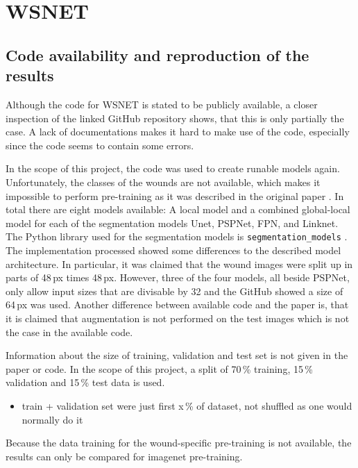 \section{WSNET}

\subsection{Code availability and reproduction of the results}

Although the code for WSNET \cite{Oota_2023_WACV} is stated to be publicly available, a closer inspection of the linked GitHub repository shows, that this is only partially the case. A lack of documentations makes it hard to make use of the code, especially since the code seems to contain some errors.

In the scope of this project, the code was used to create runable models again. Unfortunately, the classes of the wounds are not available, which makes it impossible to perform pre-training as it was described in the original paper \cite{Oota_2023_WACV}. In total there are eight models available: A local model and a combined global-local model for each of the segmentation models Unet, PSPNet, FPN, and Linknet. The Python library used for the segmentation models is \texttt{segmentation\_models} \cite{SegmentationModels}. The implementation processed showed some differences to the described model architecture. In particular, it was claimed that the wound images were split up in parts of 48\,px times 48\,px. However, three of the four models, all beside PSPNet, only allow input sizes that are divisable by 32 and the GitHub showed a size of 64\,px was used. Another difference between available code and the paper is, that it is claimed that augmentation is not performed on the test images which is not the case in the available code.

Information about the size of training, validation and test set is not given in the paper or code. In the scope of this project, a split of 70\,\% training, 15\,\% validation and 15\,\% test data is used.

\begin{itemize}
	\item train + validation set were just first x\,\% of dataset, not shuffled as one would normally do it
\end{itemize}

Because the data training for the wound-specific pre-training is not available, the results can only be compared for imagenet pre-training.


